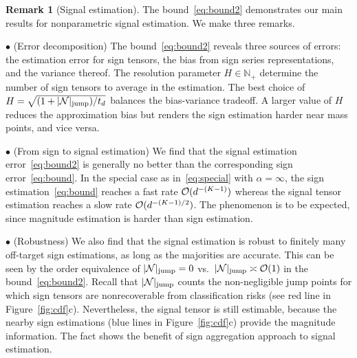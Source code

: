 \documentclass[twoside,11pt]{article}
\theoremstyle{definition}
\newtheorem{thm}{Theorem}
\newtheorem{rmk}{Remark}
\newcommand*{\KeepStyleUnderBrace}[1]{%
  \mathop{%
    \mathchoice
    {\underbrace{\displaystyle#1}}%
    {\underbrace{\textstyle#1}}%
    {\underbrace{\scriptstyle#1}}%
    {\underbrace{\scriptscriptstyle#1}}%
  }\limits
}
\begin{document}



\begin{rmk}[Signal estimation]
The bound~\eqref{eq:bound2} demonstrates our main results for nonparametric signal estimation. We make three remarks. 

$\bullet$ (Error decomposition) The bound~\eqref{eq:bound2} reveals three sources of errors: the estimation error for sign tensors, the bias from sign series representations, and the variance thereof. The resolution parameter $H\in\mathbb{N}_{+}$ determine the number of sign tensors to average in the estimation. The best choice of $H=\sqrt{(1+|\mathcal{N}|_{\text{jump}})/t_d}$ balances the bias-variance tradeoff. A larger value of $H$ reduces the approximation bias but renders the sign estimation harder near mass points, and vice versa. 

$\bullet$ (From sign to signal estimation) We find that the signal estimation error~\eqref{eq:bound2} is generally no better than the corresponding sign error~\eqref{eq:bound}. In the special case as in~\eqref{eq:special} with $\alpha=\infty$, the sign estimation~\eqref{eq:bound} reaches a fast rate $\mathcal{O}(d^{-(K-1)})$ whereas the signal tensor estimation reaches a slow rate $\mathcal{O}(d^{-(K-1)/2})$. 
The phenomenon is to be expected, since magnitude estimation is harder than sign estimation. 

$\bullet$ (Robustness) We also find that the signal estimation is robust to finitely many off-target sign estimations, as long as the majorities are accurate. This can be seen by the order equivalence of $|\mathcal{N}|_{\text{jump}}=0$ vs.\ $|\mathcal{N}|_{\text{jump}}\asymp \mathcal{O}(1)$ in the bound~\eqref{eq:bound2}. Recall that $|\mathcal{N}|_{\text{jump}}$ counts the non-negligible jump points for which sign tensors are nonrecoverable from classification risks (see red line in Figure~\ref{fig:cdf}c). Nevertheless, the signal tensor is still estimable, because the nearby sign estimations (blue lines in Figure~\ref{fig:cdf}c) provide the magnitude information. The fact shows the benefit of sign aggregation approach to signal estimation. 
\end{rmk}
\end{document}
